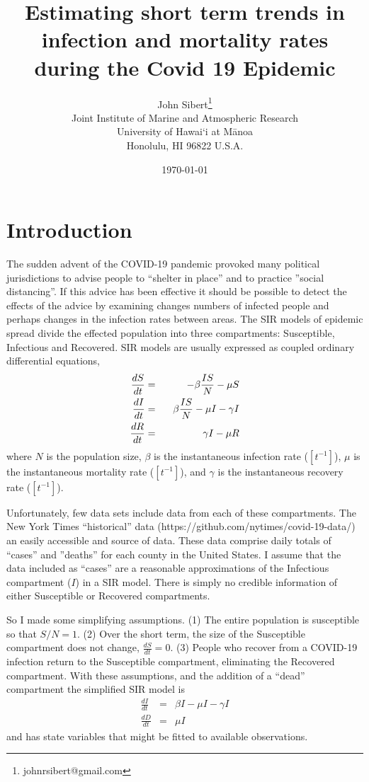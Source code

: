 \documentclass[12pt,letterpaper]{article}
\title{Estimating short term trends in infection and mortality rates
during the Covid 19 Epidemic}
\author{
John Sibert\thanks{johnrsibert@gmail.com}\\
Joint Institute of Marine and Atmospheric Research\\
University of Hawai`i at M\={a}noa\\
Honolulu, HI  96822 U.S.A.\\[0.125in]
\date{\today}
}
\newcommand\doublespacing{\baselineskip=1.6\normalbaselineskip}
\begin{document}
\maketitle

\doublespacing

\section*{Introduction}

The sudden advent of the COVID-19 pandemic provoked many political
jurisdictions to advise people to ``shelter in place'' and to practice
''social distancing''. If this advice has been effective it should be
possible to detect the effects of the advice by examining changes
numbers of infected people and perhaps changes in the infection rates
between areas. The SIR models of epidemic spread divide the effected
population into three compartments: 
Susceptible, Infectious and Recovered.
SIR models are
usually expressed as coupled ordinary differential equations,
\begin{eqnarray}
\label{eqn:SIR}
\frac{dS}{dt} &=& -\beta\frac{IS}{N} - \mu S\\
\frac{dI}{dt} &=& \hphantom{-}\beta\frac{IS}{N} - \mu I -\gamma I\\
\frac{dR}{dt} &=& \hphantom{-}\gamma I - \mu R 
\end{eqnarray}
where $N$ is the population size, $\beta$ is the instantaneous
infection rate ($[t^{-1}]$), $\mu$ is the instantaneous mortality rate
($[t^{-1}]$),  and $\gamma$ is the instantaneous recovery rate
($[t^{-1}]$).  

Unfortunately, few data sets include data from each of
these compartments. 
The New York Times ``historical'' data
(https://github.com/nytimes/covid-19-data/) an
easily accessible and source of data. These
data comprise daily totals of ``cases'' and ''deaths'' for each county
in the United States. I assume that the data included as ``cases'' are
a reasonable approximations of the Infectious compartment ($I$) in a SIR model. 
There is simply no credible information of either Susceptible or
Recovered compartments.

So I made some simplifying assumptions. (1) The entire population is
susceptible so that $S/N = 1$. (2) Over the short term, the size of the
Susceptible compartment does not change, $\frac{dS}{dt} = 0$.
(3) People who recover from a COVID-19 infection return to the Susceptible
compartment, eliminating the Recovered compartment. 
With these assumptions, and the addition of a ``dead''
compartment the simplified SIR model is
\begin{eqnarray}
\label{eqn:sSIR}
\frac{dI}{dt} &=&  \beta I - \mu I -\gamma I\\
\frac{dD}{dt} &=& \mu I
\end{eqnarray}
and has state variables that might be fitted to available observations.
\end{document}

